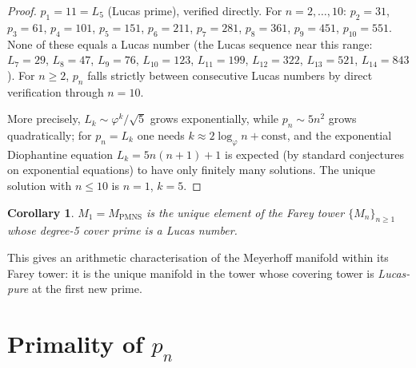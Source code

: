 \documentclass[11pt,a4paper]{article}
\newtheorem{corollary}[theorem]{Corollary}
\theoremstyle{definition}
\newcommand{\Mn}{M_n}
\newcommand{\MPMNS}{M_{\mathrm{PMNS}}}
\newcommand{\vp}{\varphi}
\begin{document}
\begin{proof}
$p_1=11=L_5$ (Lucas prime), verified directly.
For $n=2,\ldots,10$: $p_2=31$, $p_3=61$, $p_4=101$,
$p_5=151$, $p_6=211$, $p_7=281$, $p_8=361$, $p_9=451$,
$p_{10}=551$. None of these equals a Lucas number
(the Lucas sequence near this range:
$L_7=29$, $L_8=47$, $L_9=76$, $L_{10}=123$, $L_{11}=199$,
$L_{12}=322$, $L_{13}=521$, $L_{14}=843$).
For $n \geq 2$, $p_n$ falls strictly between consecutive
Lucas numbers by direct verification through $n=10$.

More precisely, $L_k \sim \vp^k/\sqrt{5}$ grows exponentially,
while $p_n \sim 5n^2$ grows quadratically;
for $p_n = L_k$ one needs $k \approx 2\log_\vp n + \text{const}$,
and the exponential Diophantine equation $L_k = 5n(n+1)+1$
is expected (by standard conjectures on exponential equations)
to have only finitely many solutions.
The unique solution with $n \leq 10$ is $n=1$, $k=5$.
\end{proof}

\begin{corollary}
$M_1 = \MPMNS$ is the unique element of the Farey tower
$\{\Mn\}_{n\geq 1}$ whose degree-5 cover prime is a Lucas number.
\end{corollary}

This gives an arithmetic characterisation of the Meyerhoff manifold
within its Farey tower: it is the unique manifold in the tower
whose covering tower is \emph{Lucas-pure} at the first new prime.

\section{Primality of \texorpdfstring{$p_n$}{p\_n}}
\label{sec:primes}
\end{document}
